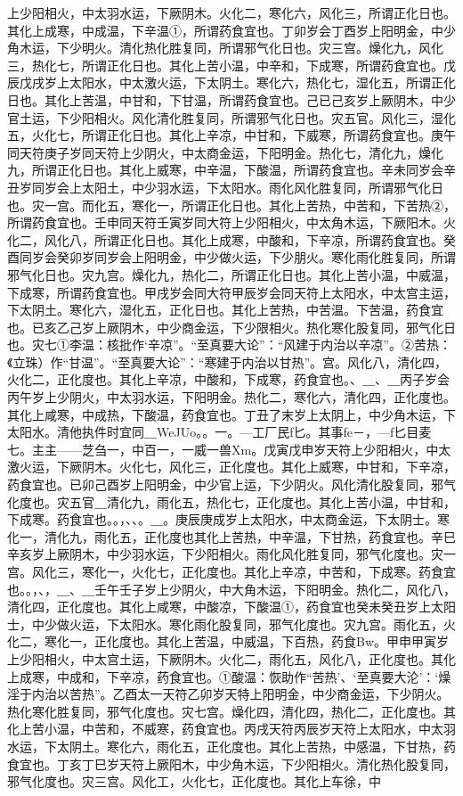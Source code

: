 \documentclass[a4paper,12pt,UTF8,twoside]{ctexbook}
\begin{document}
上少阳相火，中太羽水运，下厥阴木。火化二，寒化六，风化三，所谓正化日也。其化上成寒，中成温，下辛温①，所谓药食宜也。丁卯岁会丁酉岁上阳明金，中少角木运，下少明火。清化热化胜复同，所谓邪气化日也。灾三宫。燥化九，风化三，热化七，所谓正化日也。其化上苦小温，中辛和，下成寒，所谓药食宜也。戊辰戊戌岁上太阳水，中太激火运，下太阴土。寒化六，热化七，湿化五，所谓正化日也。其化上苦温，中甘和，下甘温，所谓药食宜也。己已己亥岁上厥阴木，中少官土运，下少阳相火。风化清化胜复同，所谓邪气化日也。灾五官。风化三，湿化五，火化七，所谓正化日也。其化上辛凉，中甘和，下威寒，所谓药食宜也。庚午同天符庚子岁同天符上少阴火，中太商金运，下阳明金。热化七，清化九，燥化九，所谓正化日也。其化上威寒，中辛温，下酸温，所谓药食宜也。辛未同岁会辛丑岁同岁会上太阳土，中少羽水运，下太阳水。雨化风化胜复同，所谓邪气化日也。灾一宫。而化五，寒化一，所谓正化日也。其化上苦热，中苦和，下苦热②，所谓药食宜也。壬申同天符壬寅岁同大符上少阳相火，中太角木运，下厥阳木。火化二，风化八，所谓正化日也。其化上成寒，中酸和，下辛凉，所谓药食宜也。癸酉同岁会癸卯岁同岁会上阳明金，中少做火运，下少朋火。寒化雨化胜复同，所谓邪气化日也。灾九宫。燥化九，热化二，所谓正化日也。其化上苦小温，中威温，下成寒，所谓药食宜也。甲戌岁会同大符甲辰岁会同天符上太阳水，中太宫主运，下太阴土。寒化六，湿化五，正化日也。其化上苦热，中苦温。下苦温，药食宜也。已亥乙己岁上厥阴木，中少商金运，下少限相火。热化寒化股复同，邪气化日也。灾七①李温：核批作‘辛凉”。“至真要大论”：“风建于内治以辛凉”。②苦热：《立珠）作“甘温”。“至真要大论”：“寒建于内治以甘热”。宫。风化八，清化四，火化二，正化度也。其化上辛凉，中酸和，下成寒，药食宜也。、＿、＿丙子岁会丙午岁上少阴火，中太羽水运，下阳明金。热化二，寒化六，清化四，正化度也。其化上咸寒，中成热，下酸温，药食宜也。丁丑了末岁上太阴上，中少角木运，下太阳水。清他执件时宜同＿WeJUo。。一。—工厂民f匕。其事fe－，—f匕目麦七。主主——芝刍一，中百一，一威一兽Xm。戊寅戊申岁天符上少阳相火，中太激火运，下厥阴木。火化七，风化三，正化度也。其化上威寒，中甘和，下辛凉，药食宜也。已卯己酉岁上阳明金，中少官上运，下少阴火。风化清化股复同，邪气化度也。灾五官＿清化九，雨化五，热化七，正化度也。其化上苦小温，中甘和，下成寒。药食宜也。。，、、。＿。庚辰庚成岁上太阳水，中太商金运，下太阴士。寒化一，清化九，雨化五，正化度也其化上苦热，中辛温，下甘热，药食宜也。辛巳辛亥岁上厥阴木，中少羽水运，下少阳相火。雨化风化胜复同，邪气化度也。灾一宫。风化三，寒化一，火化七，正化度也。其化上辛凉，中苦和，下成寒。药食宜也。。，、，＿、＿壬午壬子岁上少阴火，中大角木运，下阳明金。热化二，风化八，清化四，正化度也。其化上咸寒，中酸凉，下酸温①，药食宜也癸未癸丑岁上太阳士，中少做火运，下太阳水。寒化雨化股复同，邪气化度也。灾九宫。雨化五，火化二，寒化一，正化度也。其化上苦温，中威温，下百热，药食Bw。甲申甲寅岁上少阳相火，中太宫土运，下厥阴木。火化二，雨化五，风化八，正化度也。其化上成寒，中成和，下辛凉，药食宜也。①酸温：恢助作“苦热’、‘至真要大沦’：‘燥淫于内治以苦热”。乙酉太一天符乙卯岁天特上阳明金，中少商金运，下少阴火。热化寒化胜复同，邪气化度也。灾七宫。燥化四，清化四，热化二，正化度也。其化上苦小温，中苦和，不威寒，药食宜也。丙戌天符丙辰岁天符上太阳水，中太羽水运，下太阴土。寒化六，雨化五，正化度也。其化上苦热，中感温，下甘热，药食宜也。丁亥丁巳岁天符上厥阳木，中少角木运，下少阳相火。清化热化股复同，邪气化度也。灾三宫。风化工，火化七，正化度也。其化上车徐，中
\end{document}
